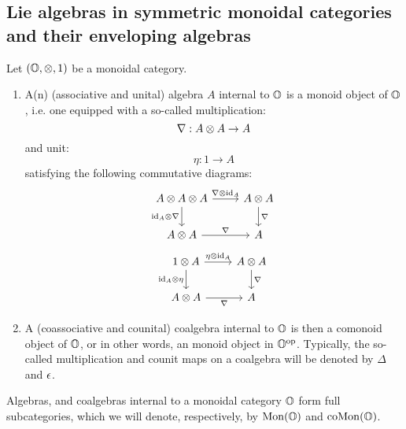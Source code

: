         \subsection{Lie algebras in symmetric monoidal categories and their enveloping algebras}
            \begin{definition} \label{def: algebras_and_coalgebras}
                Let $(\O, \tensor, 1)$ be a monoidal category. 
                    \begin{enumerate}
                        \item A(n) (associative and unital) algebra $A$ internal to $\mathbb{O}$ is a monoid object of $\mathbb{O}$, i.e. one equipped with a so-called multiplication:
                            $$\nabla: A \tensor A \to A$$
                        and unit:
                            $$\eta: 1 \to A$$
                        satisfying the following commutative diagrams:
                            $$
                                \begin{tikzcd}
                                	{A \tensor A \tensor A} & {A \tensor A} \\
                                	{A \tensor A} & {A}
                                	\arrow["{\id_A \tensor \nabla}"', from=1-1, to=2-1]
                                	\arrow["{\nabla}", from=2-1, to=2-2]
                                	\arrow["{\nabla \tensor \id_A}", from=1-1, to=1-2]
                                	\arrow["{\nabla}", from=1-2, to=2-2]
                                \end{tikzcd}
                            $$
                            $$
                                \begin{tikzcd}
                                	{1 \tensor A} & {A \tensor A} \\
                                	{A \tensor A} & {A}
                                	\arrow["{\nabla}", from=1-2, to=2-2]
                                	\arrow["{\nabla}"', from=2-1, to=2-2]
                                	\arrow["{\id_A \tensor \eta}"', from=1-1, to=2-1]
                                	\arrow["{\eta \tensor \id_A}", from=1-1, to=1-2]
                                \end{tikzcd}
                            $$
                        \item A (coassociative and counital) coalgebra internal to $\mathbb{O}$ is then a comonoid object of $\mathbb{O}$, or in other words, an monoid object in $\mathbb{O}^{\mathrm{op}}$. Typically, the so-called multiplication and counit maps on a coalgebra will be denoted by $\Delta$ and $\epsilon$.
                    \end{enumerate}
                Algebras, and coalgebras internal to a monoidal category $\mathbb{O}$ form full subcategories, which we will denote, respectively, by $\mathrm{Mon}(\mathbb{O})$ and $\mathrm{co}\mathrm{Mon}(\mathbb{O})$.
            \end{definition}

